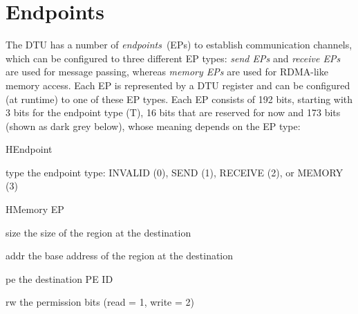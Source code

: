 \documentclass[a4paper,11pt,draft]{article}
\begin{document}
\section{Endpoints}

The DTU has a number of \emph{endpoints}~(EPs) to establish communication channels, which can be
configured to three different EP types: \emph{send EPs} and \emph{receive EPs} are used for message
passing, whereas \emph{memory EPs} are used for RDMA-like memory access. Each EP is represented by a
DTU register and can be configured (at runtime) to one of these EP types. Each EP consists of 192
bits, starting with 3 bits for the endpoint type (T), 16 bits that are reserved for now and
173 bits (shown as dark grey below), whose meaning depends on the EP type:\\[.1em]

\begin{register}{H}{Endpoint}{}
  \regnewline%
  \regnewline%
  \regnewline%
  \begin{regdesc}\begin{reglist}
    \item[type] the endpoint type: INVALID (0), SEND (1), RECEIVE (2), or MEMORY (3)
  \end{reglist}\end{regdesc}
\end{register}

\begin{register}{H}{Memory EP}{}
  \regnewline%
  \regnewline%
  \regnewline%
  \begin{regdesc}\begin{reglist}
    \item[size] the size of the region at the destination
    \item[addr] the base address of the region at the destination
    \item[pe] the destination PE ID
    \item[rw] the permission bits (read = 1, write = 2)
  \end{reglist}\end{regdesc}
\end{register}
\end{document}
